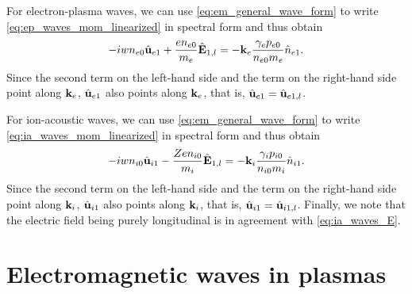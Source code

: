 \documentclass[a4paper,11pt]{report}
\begin{document}
For electron-plasma waves, we can use \cref{eq:em_general_wave_form} to write \cref{eq:ep_waves_mom_linearized} in spectral form and thus obtain
\begin{equation}
-i w n_{e0} \hat{\mathbf{u}}_{e1} + \frac{e n_{e0}}{m_e} \hat{\mathbf{E}}_{1,l} = -\mathbf{k}_e \frac{\gamma_e p_{e0}}{n_{e0} m_e} \hat{n}_{e1}. 
\end{equation}
Since the second term on the left-hand side and the term on the right-hand side point along $\mathbf{k}_e$, $\hat{\mathbf{u}}_{e1}$ also points along $\mathbf{k}_e$, that is, $\hat{\mathbf{u}}_{e1} = \hat{\mathbf{u}}_{e1,l}$.

For ion-acoustic waves, we can use \cref{eq:em_general_wave_form} to write \cref{eq:ia_waves_mom_linearized} in spectral form and thus obtain
\begin{equation}
-i w n_{i0} \hat{\mathbf{u}}_{i1} - \frac{Z e n_{i0}}{m_i} \hat{\mathbf{E}}_{1,l} = -\mathbf{k}_i \frac{\gamma_i p_{i0}}{n_{i0} m_i} \hat{n}_{i1}. 
\end{equation}
Since the second term on the left-hand side and the term on the right-hand side point along $\mathbf{k}_i$, $\hat{\mathbf{u}}_{i1}$ also points along $\mathbf{k}_i$, that is, $\hat{\mathbf{u}}_{i1} = \hat{\mathbf{u}}_{i1,l}$. Finally, we note that the electric field being purely longitudinal is in agreement with \cref{eq:ia_waves_E}.

\chapter{Electromagnetic waves in plasmas}
\end{document}
